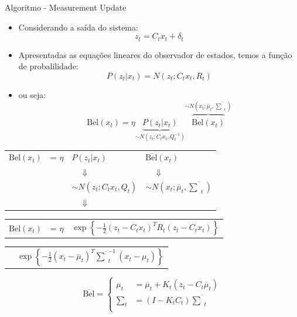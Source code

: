 Algoritmo - Measurement Update
\begin{itemize}
    \item Considerando a saída do sistema:
    \begin{equation*}
        z_t = C_t x_t + \delta_t
    \end{equation*}
    \item Apresentadas as equações lineares do observador de estados, temos a função de probalilidade:
    \begin{equation*}
        P(z_t| x_t)= N\left(z_t; C_t x_t, R_t\right)
    \end{equation*}   
    \item ou seja:
    \begin{equation*}
        \text{Bel}(x_t)  = \eta \underbrace{P(z_t|x_t)}_{\sim N\left(z_t; C_t x_t, Q_t^{-1}\right)} \overbrace{\overline{\text{Bel}}(x_t)}^{\sim N\left(x_t; \overline{\mu}_t, \overline{\textstyle\sum}_t\right)}
    \end{equation*}
\end{itemize}


\begin{tabular}{p{1.5cm} l l l}
    $\text{Bel}(x_t)$  & = $\eta$ & $P(z_t| x_t)$ & $\overline{\text{Bel}}(x_t)$ \\
    & & $\quad \Downarrow$ & $\quad\Downarrow$ \\
    & & $\sim N\left(z_t; C_t x_t, Q_t\right)$ & $\sim N\left(x_t; \overline{\mu}_t, \overline{\textstyle\sum}_t\right)$ \\
    & & $\quad \Downarrow$ &  \\
\end{tabular}

\begin{tabular}{p{1.5cm} l l}
    $\text{Bel}(x_t)$  & = $\eta$ & $\exp\left\{  -\displaystyle\frac{1}{2} \left(z_t - C_t x_t\right)^T R_t \left(z_t - C_t x_t\right)  \right\}$ \\
\end{tabular}
    
\begin{tabular}{p{2.5cm} l}
    & $\exp\left\{ -\displaystyle\frac{1}{2} \left(x_t - \overline{\mu}_t\right)^T \overline{\textstyle\sum}_t^{-1} \left(x_t - \mu_t\right) \right\}$
\end{tabular}  

\begin{equation}
    \overline{\text{Bel}} = 
    \left\{
    \begin{aligned}
            \mu_t & = \overline{\mu}_t + K_t(z_t -C_t \overline{\mu}_t)\\
            \textstyle\sum_t & = (I-K_tC_t)\overline{\textstyle\sum}_t \\
    \end{aligned} \right.
\end{equation}

